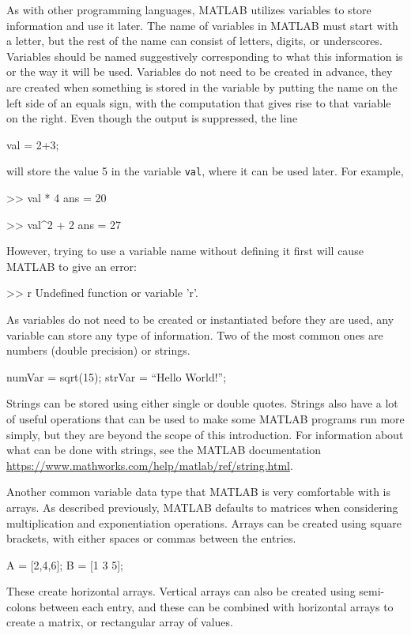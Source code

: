 As with other programming languages, MATLAB utilizes variables to store information and use it later. The name of variables in MATLAB must start with a letter, but the rest of the name can consist of letters, digits, or underscores. Variables should be named suggestively corresponding to what this information is or the way it will be used. Variables do not need to be created in advance, they are created when something is stored in the variable by putting the name on the left side of an equals sign, with the computation that gives rise to that variable on the right. Even though the output is suppressed, the line
\begin{matlab}
val = 2+3;
\end{matlab}
will store the value 5 in the variable \texttt{val}, where it can be used later. For example,
\begin{matlab}
>> val * 4
ans = 
    20
    
>> val^2 + 2
ans = 
    27
\end{matlab}
However, trying to use a variable name without defining it first will cause MATLAB to give an error:
\begin{matlab}
>> r
Undefined function or variable 'r'.
\end{matlab}

As variables do not need to be created or instantiated before they are used, any variable can store any type of information. Two of the most common ones are numbers (double precision) or strings.

\begin{matlab}
numVar = sqrt(15);
strVar = ``Hello World!'';
\end{matlab}

Strings can be stored using either single or double quotes. Strings also have a lot of useful operations that can be used to make some MATLAB programs run more simply, but they are beyond the scope of this introduction. For information about what can be done with strings, see the MATLAB documentation \url{https://www.mathworks.com/help/matlab/ref/string.html}.

Another common variable data type that MATLAB is very comfortable with is arrays. As described previously, MATLAB defaults to matrices when considering multiplication and exponentiation operations. Arrays can be created using square brackets, with either spaces or commas between the entries.
\begin{matlab}
A = [2,4,6];
B = [1 3 5];
\end{matlab}
These create horizontal arrays. Vertical arrays can also be created using semi-colons between each entry, and these can be combined with horizontal arrays to create a matrix, or rectangular array of values.

